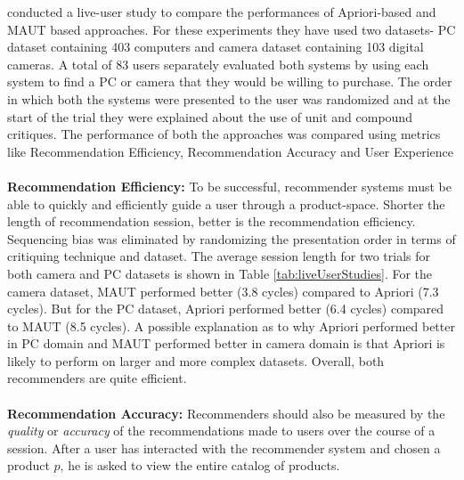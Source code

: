 \cite{liveUserStudy} conducted a live-user study to compare the performances of Apriori-based and MAUT based approaches.
For these experiments they have used two datasets- PC dataset containing 403 computers and camera dataset containing 103 digital cameras.
A total of 83 users separately evaluated both systems by using each system to find a PC or camera that they would be willing to purchase.
The order in which both the systems were presented to the user was randomized and at the start of the trial they were explained about the use of unit and compound critiques.
The performance of both the approaches was compared using metrics like Recommendation Efficiency, Recommendation Accuracy and User Experience\\
\\
\textbf{Recommendation Efficiency:} To be successful, recommender systems must be able to quickly and efficiently guide a user through a product-space. 
Shorter the length of recommendation session, better is the recommendation efficiency.
Sequencing bias was eliminated by randomizing the presentation order in terms of critiquing technique and dataset.
The average session length for two trials for both camera and PC datasets is shown in Table \ref{tab:liveUserStudies}.
For the camera dataset, MAUT performed better (3.8 cycles) compared to Apriori (7.3 cycles).
But for the PC dataset, Apriori performed better (6.4 cycles) compared to MAUT (8.5 cycles).
A possible explanation as to why Apriori performed better in PC domain and MAUT performed better in camera domain is that Apriori is likely to perform on larger and more complex datasets.
Overall, both recommenders are quite efficient.\\
\\
\textbf{Recommendation Accuracy:} 
Recommenders should also be measured by the \textit{quality} or \textit{accuracy} of the recommendations made to users over the course of a session. 
After a user has interacted with the recommender system and chosen a product $p$, he is asked to view the entire catalog of products. 
